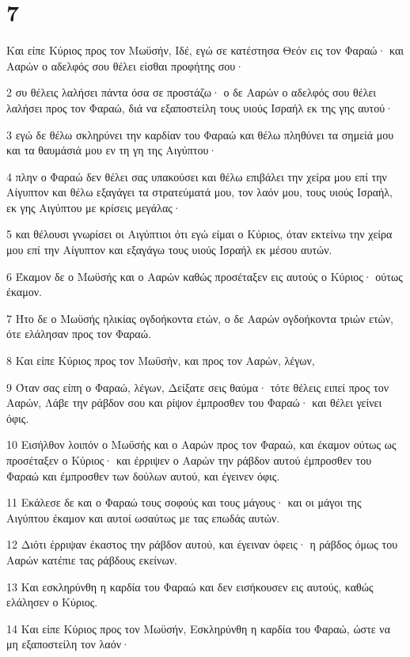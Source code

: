 \chapter{7}

\par Και είπε Κύριος προς τον Μωϋσήν, Ιδέ, εγώ σε κατέστησα Θεόν εις τον Φαραώ· και Ααρών ο αδελφός σου θέλει είσθαι προφήτης σου·
\par 2 συ θέλεις λαλήσει πάντα όσα σε προστάζω· ο δε Ααρών ο αδελφός σου θέλει λαλήσει προς τον Φαραώ, διά να εξαποστείλη τους υιούς Ισραήλ εκ της γης αυτού·
\par 3 εγώ δε θέλω σκληρύνει την καρδίαν του Φαραώ και θέλω πληθύνει τα σημείά μου και τα θαυμάσιά μου εν τη γη της Αιγύπτου·
\par 4 πλην ο Φαραώ δεν θέλει σας υπακούσει και θέλω επιβάλει την χείρα μου επί την Αίγυπτον και θέλω εξαγάγει τα στρατεύματά μου, τον λαόν μου, τους υιούς Ισραήλ, εκ γης Αιγύπτου με κρίσεις μεγάλας·
\par 5 και θέλουσι γνωρίσει οι Αιγύπτιοι ότι εγώ είμαι ο Κύριος, όταν εκτείνω την χείρα μου επί την Αίγυπτον και εξαγάγω τους υιούς Ισραήλ εκ μέσου αυτών.
\par 6 Έκαμον δε ο Μωϋσής και ο Ααρών καθώς προσέταξεν εις αυτούς ο Κύριος· ούτως έκαμον.
\par 7 Ήτο δε ο Μωϋσής ηλικίας ογδοήκοντα ετών, ο δε Ααρών ογδοήκοντα τριών ετών, ότε ελάλησαν προς τον Φαραώ.
\par 8 Και είπε Κύριος προς τον Μωϋσήν, και προς τον Ααρών, λέγων,
\par 9 Όταν σας είπη ο Φαραώ, λέγων, Δείξατε σεις θαύμα· τότε θέλεις ειπεί προς τον Ααρών, Λάβε την ράβδον σου και ρίψον έμπροσθεν του Φαραώ· και θέλει γείνει όφις.
\par 10 Εισήλθον λοιπόν ο Μωϋσής και ο Ααρών προς τον Φαραώ, και έκαμον ούτως ως προσέταξεν ο Κύριος· και έρριψεν ο Ααρών την ράβδον αυτού έμπροσθεν του Φαραώ και έμπροσθεν των δούλων αυτού, και έγεινεν όφις.
\par 11 Εκάλεσε δε και ο Φαραώ τους σοφούς και τους μάγους· και οι μάγοι της Αιγύπτου έκαμον και αυτοί ωσαύτως με τας επωδάς αυτών.
\par 12 Διότι έρριψαν έκαστος την ράβδον αυτού, και έγειναν όφεις· η ράβδος όμως του Ααρών κατέπιε τας ράβδους εκείνων.
\par 13 Και εσκληρύνθη η καρδία του Φαραώ και δεν εισήκουσεν εις αυτούς, καθώς ελάλησεν ο Κύριος.
\par 14 Και είπε Κύριος προς τον Μωϋσήν, Εσκληρύνθη η καρδία του Φαραώ, ώστε να μη εξαποστείλη τον λαόν·
